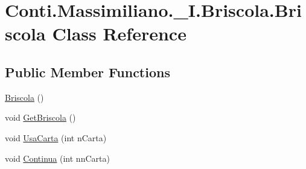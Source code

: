 \hypertarget{class_conti_1_1_massimiliano_1_1__5_i_1_1_briscola_1_1_briscola}{}\section{Conti.\+Massimiliano.\+\_\+I.\+Briscola.\+Briscola Class Reference}
\label{class_conti_1_1_massimiliano_1_1__5_i_1_1_briscola_1_1_briscola}
\subsection*{Public Member Functions}
\begin{DoxyCompactItemize}
\item 
\hyperlink{class_conti_1_1_massimiliano_1_1__5_i_1_1_briscola_1_1_briscola_af7ad37cd4d1d05da2444120b8476c6c8}{Briscola} ()
\item 
void \hyperlink{class_conti_1_1_massimiliano_1_1__5_i_1_1_briscola_1_1_briscola_a4bdba07c9afe58bd18b169c801de4171}{Get\+Briscola} ()
\item 
void \hyperlink{class_conti_1_1_massimiliano_1_1__5_i_1_1_briscola_1_1_briscola_a78da2368c5afe82542e366c5a282b583}{Usa\+Carta} (int n\+Carta)
\item 
void \hyperlink{class_conti_1_1_massimiliano_1_1__5_i_1_1_briscola_1_1_briscola_a55f3c866353cab10aa111fc41355c530}{Continua} (int nn\+Carta)
\end{DoxyCompactItemize}
